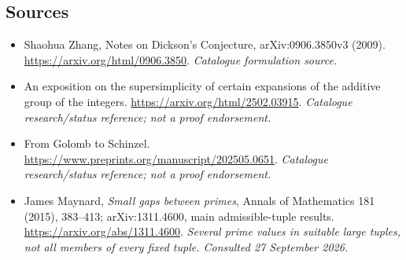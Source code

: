 \documentclass[11pt,a4paper]{article}
\numberwithin{equation}{section}
\begin{document}
\subsection{Sources}
\begin{itemize}\raggedright
\item[\textnormal{[S1]}]\hypertarget{source:statement:1}{} Shaohua Zhang, Notes on Dickson's Conjecture, arXiv:0906.3850v3 (2009).
\url{https://arxiv.org/html/0906.3850}.
{\small\textit{Catalogue formulation source.}}
\item[\textnormal{[S2]}]\hypertarget{source:statement:2}{} An exposition on the supersimplicity of certain expansions of the additive group of the integers.
\url{https://arxiv.org/html/2502.03915}.
{\small\textit{Catalogue research/status reference; not a proof endorsement.}}
\item[\textnormal{[S3]}]\hypertarget{source:statement:3}{} From Golomb to Schinzel.
\url{https://www.preprints.org/manuscript/202505.0651}.
{\small\textit{Catalogue research/status reference; not a proof endorsement.}}

\item[\textnormal{[E1]}]\hypertarget{extra:statement:1}{} James Maynard, \emph{Small gaps between primes}, Annals of Mathematics 181 (2015), 383--413; arXiv:1311.4600, main admissible-tuple results.
\url{https://arxiv.org/abs/1311.4600}.
{\small\textit{Several prime values in suitable large tuples, not all members of every fixed tuple. Consulted 27 September 2026.}}
\end{itemize}
\end{document}
